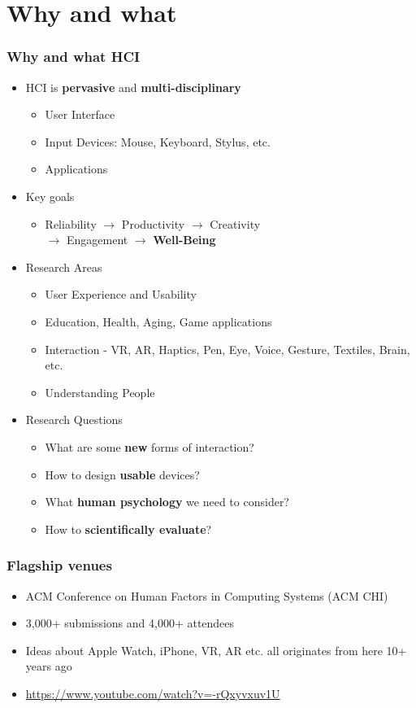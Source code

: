 \documentclass{beamer}
\begin{document}
\section{Why and what} %

\begin{frame}
\frametitle{Why and what HCI}
\begin{itemize}
	\item HCI is \textbf{pervasive} and \textbf{multi-disciplinary}
	\begin{itemize}
		\item User Interface
		\item Input Devices: Mouse, Keyboard, Stylus, etc.
		\item Applications
	\end{itemize}
	\item Key goals
	\begin{itemize}
		\item Reliability $\rightarrow$ Productivity $\rightarrow$ Creativity \\  $\rightarrow$ Engagement $\rightarrow$ \textbf{Well-Being }
	\end{itemize}
	\item Research Areas
	\begin{itemize}
		\item User Experience and Usability
		\item Education, Health, Aging, Game applications
		\item Interaction - VR, AR, Haptics, Pen, Eye, Voice, Gesture, Textiles, Brain, etc.
		\item Understanding People
	\end{itemize}
	\item Research Questions
	\begin{itemize}
		\item What are some \textbf{new} forms of interaction?
		\item How to design \textbf{usable} devices?
		\item What \textbf{human psychology} we need to consider?
		\item How to \textbf{scientifically evaluate}?
	\end{itemize}
\end{itemize}
\end{frame}

\begin{frame}
\frametitle{Flagship venues}
\begin{itemize}
	\item ACM Conference on Human Factors in Computing Systems (ACM CHI)
	\item 3,000+ submissions and 4,000+ attendees
	\item Ideas about Apple Watch, iPhone, VR, AR etc. all originates from here 10+ years ago
	\item \url{https://www.youtube.com/watch?v=-rQxyvxuv1U}
\end{itemize}
\end{frame}
\end{document}
